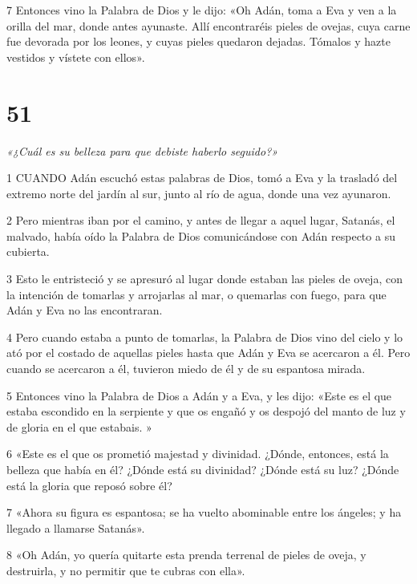 \par 7 Entonces vino la Palabra de Dios y le dijo: «Oh Adán, toma a Eva y ven a la orilla del mar, donde antes ayunaste. Allí encontraréis pieles de ovejas, cuya carne fue devorada por los leones, y cuyas pieles quedaron dejadas. Tómalos y hazte vestidos y vístete con ellos».

\chapter{51}

\par \textit{«¿Cuál es su belleza para que debiste haberlo seguido?»}

\par 1 CUANDO Adán escuchó estas palabras de Dios, tomó a Eva y la trasladó del extremo norte del jardín al sur, junto al río de agua, donde una vez ayunaron.

\par 2 Pero mientras iban por el camino, y antes de llegar a aquel lugar, Satanás, el malvado, había oído la Palabra de Dios comunicándose con Adán respecto a su cubierta.

\par 3 Esto le entristeció y se apresuró al lugar donde estaban las pieles de oveja, con la intención de tomarlas y arrojarlas al mar, o quemarlas con fuego, para que Adán y Eva no las encontraran.

\par 4 Pero cuando estaba a punto de tomarlas, la Palabra de Dios vino del cielo y lo ató por el costado de aquellas pieles hasta que Adán y Eva se acercaron a él. Pero cuando se acercaron a él, tuvieron miedo de él y de su espantosa mirada.

\par 5 Entonces vino la Palabra de Dios a Adán y a Eva, y les dijo: «Este es el que estaba escondido en la serpiente y que os engañó y os despojó del manto de luz y de gloria en el que estabais. »

\par 6 «Este es el que os prometió majestad y divinidad. ¿Dónde, entonces, está la belleza que había en él? ¿Dónde está su divinidad? ¿Dónde está su luz? ¿Dónde está la gloria que reposó sobre él?

\par 7 «Ahora su figura es espantosa; se ha vuelto abominable entre los ángeles; y ha llegado a llamarse Satanás».

\par 8 «Oh Adán, yo quería quitarte esta prenda terrenal de pieles de oveja, y destruirla, y no permitir que te cubras con ella».

